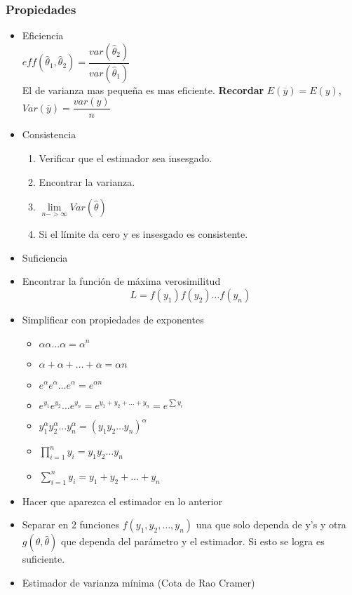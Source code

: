\subsubsection{Propiedades}
\begin{itemize}
	\item Eficiencia\\
	$eff(\hat{\theta}_1,\hat{\theta}_2)=\dfrac{var(\hat{\theta}_2)}{var(\hat{\theta}_1)}$\\
	El de varianza mas pequeña es mas eficiente.
	\textbf{Recordar }$E(\overline{y})=E(y)$, $Var(\overline{y})=\dfrac{var(y)}{n}$
	\item Consistencia
	\begin{enumerate}
		\item Verificar que el estimador sea insesgado.
		\item Encontrar la varianza.
		\item $\lim\limits_{n->\infty}Var(\hat{\theta})$
		\item Si el límite da cero y es insesgado es consistente.
	\end{enumerate}
	\item Suficiencia
	\item Encontrar la función de máxima verosimilitud
	$$L=f(y_1)f(y_2)\dots f(y_n)$$
	\item Simplificar con propiedades de exponentes
	\begin{itemize}
		\item $\alpha \alpha \dots \alpha=\alpha^n$
		\item $\alpha+ \alpha+ \dots +\alpha=\alpha n$
		\item $e^{\alpha}e^{\alpha}\dots e^{\alpha}=e^{\alpha n}$
		\item $e^{y_1}e^{y_2}\dots e^{y_n}=e^{y_1+y_2+\dots +y_n}=e^{\sum y_i}$
		\item $y_1^\alpha y_2^\alpha\dots y_n^\alpha=(y_1y_2\dots y_n)^\alpha$
		\item $\prod_{i=1}^{n}y_i=y_1y_2\dots y_n$
		\item $\sum_{i=1}^{n}y_i=y_1+y_2+\dots +y_n$
	\end{itemize}
	\item Hacer que aparezca el estimador en lo anterior
	\item Separar en 2 funciones $f(y_1,y_2,\dots,y_n)$ una que solo dependa de y's y otra $g(\theta,\hat{\theta})$ que dependa del parámetro y el estimador. Si esto se logra es suficiente.
	\item Estimador de varianza mínima (Cota de Rao Cramer)

\end{itemize}
